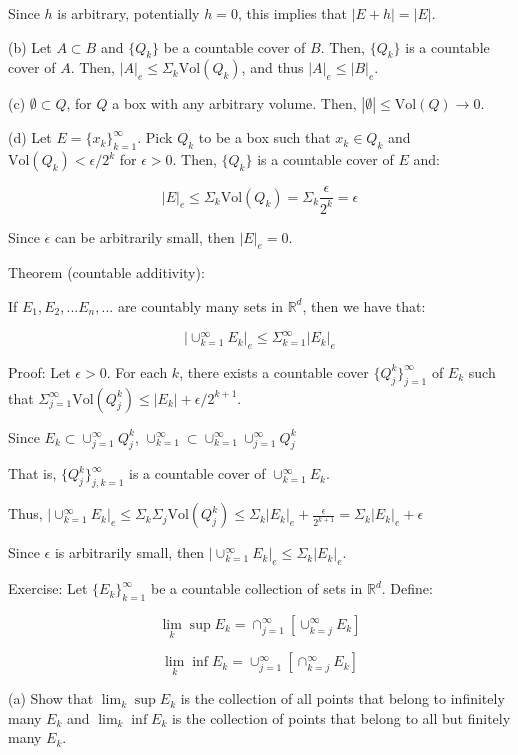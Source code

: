\documentclass[10pt]{article}
\newcommand{\vol}{\text{Vol}}
\begin{document}
Since $h$ is arbitrary, potentially $h = 0$, this implies that $|E+h| = |E|$.

(b) Let $A \subset B$ and $\{ Q_k \}$ be a countable cover of $B$. Then, $\{ Q_k \}$ is a countable cover of $A$. Then, $|A|_e \leq \Sigma_k \text{Vol}(Q_k)$, and thus $|A|_e \leq |B|_e$.

(c) $\emptyset \subset Q$, for $Q$ a box with any arbitrary volume. Then, $|\emptyset| \leq \vol(Q) \rightarrow 0$.

(d) Let $E = \{ x_k \}_{k=1}^{\infty}$. Pick $Q_k$ to be a box such that $x_k \in Q_k$ and $\vol(Q_k) < \epsilon/2^k$ for $\epsilon > 0$.
Then, $\{ Q_k \}$ is a countable cover of $E$ and:

$$ |E|_e \leq \Sigma_k \vol(Q_k) = \Sigma_k \frac{\epsilon}{2^k} = \epsilon$$

Since $\epsilon$ can be arbitrarily small, then $|E|_e = 0$.

Theorem (countable additivity):

If $E_1,E_2,...E_n,...$ are countably many sets in $\mathbb{R}^d$, then we have that:

$$ |\cup_{k=1}^{\infty} E_k|_e \leq \Sigma_{k=1}^{\infty} |E_k|_e $$

Proof: Let $\epsilon > 0$. For each $k$, there exists a countable cover $\{ Q_j^k\}_{j=1}^\infty$ of $E_k$ such that $ \Sigma_{j=1}^\infty \vol(Q_j^k) \leq |E_k| + \epsilon/2^{k+1}$.

Since $E_k \subset \cup_{j=1}^\infty Q_j^k$, $\cup_{k=1}^\infty \subset \cup_{k=1}^\infty\cup_{j=1}^\infty Q_j^k$

That is, $\{ Q_j^k \}_{j,k=1}^\infty$ is a countable cover of $\cup_{k=1}^{\infty} E_k$.

Thus, $|\cup_{k=1}^{\infty} E_k|_e \leq  \Sigma_k \Sigma_j \vol(Q_j^k) \leq \Sigma_k |E_k|_e + \frac{\epsilon}{2^{k+1}} = \Sigma_k |E_k|_e + \epsilon$

Since $\epsilon$ is arbitrarily small, then $|\cup_{k=1}^{\infty} E_k|_e \leq \Sigma_k |E_k|_e$.

Exercise: Let $\{ E_k \}_{k=1}^\infty$ be a countable collection of sets in $\mathbb{R}^d$. Define:

$$\lim_k \sup E_k = \cap_{j=1}^\infty [ \cup_{k=j}^\infty E_k ]$$

$$\lim_k \inf E_k = \cup_{j=1}^\infty [ \cap_{k=j}^\infty E_k ]$$

(a) Show that $\lim_k \sup E_k$ is the collection of all points that belong to infinitely many $E_k$ and $\lim_k \inf E_k$ is the collection of points that belong to all but finitely many $E_k$.
\end{document}
